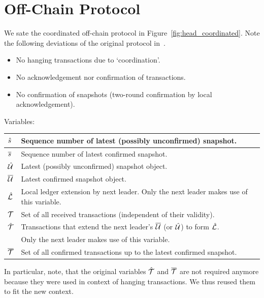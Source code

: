 \section{Off-Chain Protocol}

We sate the coordinated off-chain protocol in Figure~\ref{fig:head_coordinated}.
Note the following deviations of the original protocol in~\cite{hydrahead20}.

\begin{itemize}
\item No hanging transactions due to `coordination'.
\item No acknowledgement nor confirmation of transactions.
\item No confirmation of snapshots (two-round confirmation by local acknowledgement).
\end{itemize}

Variables:

\begin{center}
\begin{tabular}{|l|l|}\hline
  $\hat s$  & Sequence number of latest (possibly unconfirmed) snapshot. \\ \hline
  $\overline s$  & Sequence number of latest confirmed snapshot. \\ \hline
  $\hat {\mathcal U}$ & Latest (possibly unconfirmed) snapshot object. \\ \hline
  $\overline {\mathcal U}$ & Latest confirmed snapshot object. \\ \hline
  $\hat {\mathcal L}$ & Local ledger extension by next leader. Only the next leader
  makes use of this variable.\\ \hline
  ${\mathcal T}$    & Set of all received transactions (independent of their validity).\\  \hline
  $\hat {\mathcal T}$ & Transactions that extend the next leader's $\overline {\mathcal U}$ (or $\hat {\mathcal U}$) to form $\hat {\mathcal L}$.\\
           & Only the next leader makes use of this variable.\\  \hline
  $\overline {\mathcal T}$ & Set of all confirmed transactions up to the latest confirmed snapshot.\\  \hline
\end{tabular}
\end{center}

In particular, note, that the original variables $\hat {\mathcal T}$ and $\overline {\mathcal T}$ are not required anymore because they
were used in context of hanging transactions. We thus reused them to fit the new context.




